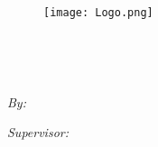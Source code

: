 \documentclass[
11pt, %
english, %
onehalfspacing, %
liststotoc, %
headsepline, %
]{MastersDoctoralThesis} %
\author{Ryan \textsc{Naidoo}} %
\begin{document}
	
\frontmatter %

\pagestyle{plain} %


\begin{titlepage}
\begin{center}

{\scshape\LARGE \univname\par}\vspace{0.5cm} %
{\scshape\large \facname\par}

\begin{figure}[!h]
	\centering
	\texttt{[image: Logo.png]} %
\end{figure}
\vspace{0.5cm}

\HRule \\[0.4cm] %
{\huge \bfseries \ttitle\par}\vspace{0.4cm} %
\HRule \\[1.5cm] %
 
\begin{minipage}[t]{0.4\textwidth}
\begin{flushleft} \large
\emph{By:}\\
\textcolor{magenta}{\authorname} %
\end{flushleft}
\end{minipage}
\begin{minipage}[t]{0.4\textwidth}
\begin{flushright} \large
\emph{Supervisor:} \\
\textcolor{magenta}{\supname} %
\end{flushright}
\end{minipage}\\[2cm]
 

\end{center}
\end{titlepage}
\end{document}
